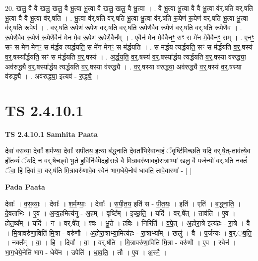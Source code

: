 \documentclass[17pt]{extarticle}
\begin{document}
20. खलु॒ वै वै खलु॒ खलु॒ वै भू॒त्वा भू॒त्वा वै खलु॒ खलु॒ वै भू॒त्वा । . वै भू॒त्वा भू॒त्वा वै वै भू॒त्वा व॑र्.षति वर्.षति भू॒त्वा वै वै भू॒त्वा व॑र्.षति । . भू॒त्वा व॑र्.षति वर्.षति भू॒त्वा भू॒त्वा व॑र्.षति रू॒पेण॑ रू॒पेण॑ वर्.षति भू॒त्वा भू॒त्वा व॑र्.षति रू॒पेण॑ । . व॒र्॒.ष॒ति॒ रू॒पेण॑ रू॒पेण॑ वर्.षति वर्.षति रू॒पेणै॒वैव रू॒पेण॑ वर्.षति वर्.षति रू॒पेणै॒व । . रू॒पेणै॒वैव रू॒पेण॑ रू॒पेणै॒वैन॑ मेन मे॒व रू॒पेण॑ रू॒पेणै॒वैन᳚म् । . ए॒वैन॑ मेन मे॒वैवैनꣳ॒॒ सꣳ स मे॑न मे॒वैवैनꣳ॒॒ सम् । . ए॒नꣳ॒॒ सꣳ स मे॑न मेनꣳ॒॒ स म॑र्द्धय त्यर्द्धयति॒ स मे॑न मेनꣳ॒॒ स म॑र्द्धयति । . स म॑र्द्धय त्यर्द्धयति॒ सꣳ स म॑र्द्धयति व॒र्॒.षस्य॑ व॒र्॒.षस्या᳚र्द्धयति॒ सꣳ स म॑र्द्धयति व॒र्॒.षस्य॑ । . अ॒र्द्ध॒य॒ति॒ व॒र्॒.षस्य॑ व॒र्॒.षस्या᳚र्द्धय त्यर्द्धयति व॒र्॒.षस्या व॑रुद्ध्या॒ अव॑रुद्ध्यै व॒र्॒.षस्या᳚र्द्धय त्यर्द्धयति व॒र्॒.षस्या व॑रुद्ध्यै । . व॒र्॒.षस्या व॑रुद्ध्या॒ अव॑रुद्ध्यै व॒र्॒.षस्य॑ व॒र्॒.षस्या व॑रुद्ध्यै । . अव॑रुद्ध्या॒ इत्यव॑ - रु॒द्ध्यै॒ । \newline
\pagebreak
{}

\section{ TS 2.4.10.1 }

\textbf{TS 2.4.10.1 } \newline
\textbf{Samhita Paata} \newline

देवा॑ वसव्या॒ देवाः᳚ शर्मण्या॒ देवाः᳚ सपीतय॒ इत्या ब॑द्ध्नाति दे॒वता॑भिरे॒वान्व॒हं ॅवृष्टि॑मिच्छति॒ यदि॒ वर्.षे॒त्-ताव॑त्ये॒व हो॑त॒व्यं॑ ॅयदि॒ न वर्.षे॒च्छ्वो भू॒ते ह॒विर्निर्व॑पेदहोरा॒त्रे वै मि॒त्रावरु॑णावहोरा॒त्राभ्यां॒ खलु॒ वै प॒र्जन्यो॑ वर्.षति॒ नक्तं॑ ॅवा॒ हि दिवा॑ वा॒ वर्.ष॑ति मि॒त्रावरु॑णावे॒व स्वेन॑ भाग॒धेये॒नोप॑ धावति॒ तावे॒वास्मा॑ - [  ] \newline

\textbf{Pada Paata} \newline

देवाः᳚ । व॒स॒व्याः॒ । देवाः᳚ । श॒र्म॒ण्याः॒ । देवाः᳚ । स॒पी॒त॒य॒ इति॑ स - पी॒त॒यः॒ । इति॑ । एति॑ । ब॒द्ध्ना॒ति॒ । दे॒वता॑भिः । ए॒व । अ॒न्व॒हमित्य॑नु - अ॒हम् । वृष्टि᳚म् । इ॒च्छ॒ति॒ । यदि॑ । वर्.षे᳚त् । ताव॑ति । ए॒व । हो॒त॒व्य᳚म् । यदि॑ । न । वर्.षे᳚त् । श्वः । भू॒ते । ह॒विः । निरिति॑ । व॒पे॒त् । अ॒हो॒रा॒त्रे इत्य॑हः - रा॒त्रे । वै । मि॒त्रावरु॑णा॒विति॑ मि॒त्रा - वरु॑णौ । अ॒हो॒रा॒त्राभ्या॒मित्य॑हः - रा॒त्राभ्या᳚म् । खलु॑ । वै । प॒र्जन्यः॑ । व॒र्.॒ष॒ति॒ । नक्त᳚म् । वा॒ । हि । दिवा᳚ । वा॒ । वर्.ष॑ति । मि॒त्रावरु॑णा॒विति॑ मि॒त्रा - वरु॑णौ । ए॒व । स्वेन॑ । भा॒ग॒धेये॒नेति॑ भाग - धेये॑न । उपेति॑ । धा॒व॒ति॒ । तौ । ए॒व । अ॒स्मै॒ ।  \newline
\end{document}

